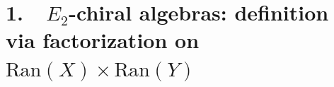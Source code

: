 %

\providecommand{\cA}{\mathcal{A}}
\providecommand{\cB}{\mathcal{B}}
\providecommand{\cC}{\mathcal{C}}
\providecommand{\cD}{\mathcal{D}}
\providecommand{\cE}{\mathcal{E}}
\providecommand{\cF}{\mathcal{F}}
\providecommand{\cM}{\mathcal{M}}
\providecommand{\cO}{\mathcal{O}}
\providecommand{\cZ}{\mathcal{Z}}
\providecommand{\Ran}{\mathrm{Ran}}
\providecommand{\Fact}{\mathrm{Fact}}
\providecommand{\Rep}{\mathrm{Rep}}
\providecommand{\Mod}{\mathrm{Mod}}
\providecommand{\Hom}{\mathrm{Hom}}
\providecommand{\RHom}{\mathrm{RHom}}
\providecommand{\End}{\mathrm{End}}
\providecommand{\Sym}{\mathrm{Sym}}
\providecommand{\HH}{\mathrm{HH}}
\providecommand{\HC}{\mathrm{HC}}
\providecommand{\ChirHoch}{\mathrm{ChirHoch}}
\providecommand{\FM}{\overline{\mathrm{FM}}}
\providecommand{\Ger}{\mathrm{Ger}}
\providecommand{\BV}{\mathrm{BV}}
\providecommand{\Eone}{E_1}
\providecommand{\Etwo}{E_2}
\providecommand{\En}{E_n}
\providecommand{\Einf}{E_\infty}
\providecommand{\Ainf}{A_\infty}
\providecommand{\Linf}{L_\infty}
\providecommand{\SC}{\mathrm{SC}}
\providecommand{\frakg}{\mathfrak{g}}
\providecommand{\Uq}{U_q}
\providecommand{\Uhbar}{U_\hbar}
\providecommand{\id}{\mathrm{id}}
\providecommand{\op}{\mathrm{op}}
\providecommand{\colim}{\mathrm{colim}}
\providecommand{\Perf}{\mathrm{Perf}}
\providecommand{\Fuk}{\mathrm{Fuk}}
\providecommand{\Coh}{\mathrm{Coh}}
\providecommand{\CY}{\mathrm{CY}}
\providecommand{\Tr}{\mathrm{Tr}}
\providecommand{\barB}{\overline{B}}
\providecommand{\Omegach}{\Omega^{\mathrm{ch}}}
\providecommand{\hbar}{\hslash}
\providecommand{\Vect}{\mathrm{Vect}}
\providecommand{\DGCat}{\mathbf{dgCat}}
\providecommand{\RTT}{\mathrm{RTT}}


\section*{1.\ \ $\Etwo$-chiral algebras: definition via factorization on
 $\Ran(X) \times \Ran(Y)$}
\label{note:sec:e2-def}

